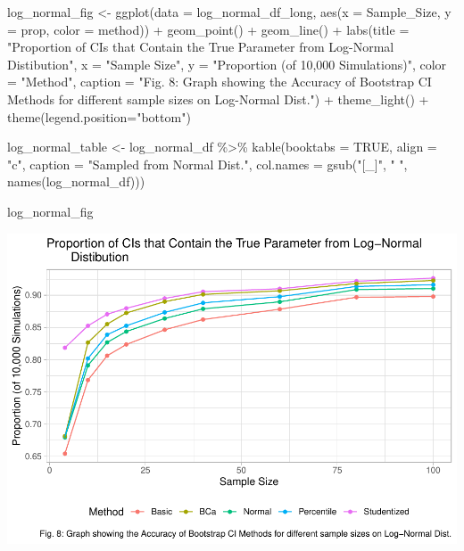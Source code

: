 \documentclass[12pt]{article}
\newenvironment{Shaded}{\begin{snugshade}}{\end{snugshade}}
\newcommand{\AttributeTok}[1]{\textcolor[rgb]{0.77,0.63,0.00}{#1}}
\newcommand{\ConstantTok}[1]{\textcolor[rgb]{0.00,0.00,0.00}{#1}}
\newcommand{\FunctionTok}[1]{\textcolor[rgb]{0.00,0.00,0.00}{#1}}
\newcommand{\NormalTok}[1]{#1}
\newcommand{\OtherTok}[1]{\textcolor[rgb]{0.56,0.35,0.01}{#1}}
\newcommand{\SpecialCharTok}[1]{\textcolor[rgb]{0.00,0.00,0.00}{#1}}
\newcommand{\StringTok}[1]{\textcolor[rgb]{0.31,0.60,0.02}{#1}}
\begin{document}
\begin{Shaded}
\begin{Highlighting}[]
\NormalTok{log\_normal\_fig }\OtherTok{\textless{}{-}} \FunctionTok{ggplot}\NormalTok{(}\AttributeTok{data =}\NormalTok{ log\_normal\_df\_long, }
                    \FunctionTok{aes}\NormalTok{(}\AttributeTok{x =}\NormalTok{ Sample\_Size, }\AttributeTok{y =}\NormalTok{ prop, }\AttributeTok{color =}\NormalTok{ method)) }\SpecialCharTok{+} 
  \FunctionTok{geom\_point}\NormalTok{() }\SpecialCharTok{+} \FunctionTok{geom\_line}\NormalTok{() }\SpecialCharTok{+} 
  \FunctionTok{labs}\NormalTok{(}\AttributeTok{title =} \StringTok{"Proportion of CIs that Contain the True Parameter from Log{-}Normal }
\StringTok{       Distibution"}\NormalTok{, }\AttributeTok{x =} \StringTok{"Sample Size"}\NormalTok{, }
       \AttributeTok{y =} \StringTok{"Proportion (of 10,000 Simulations)"}\NormalTok{, }\AttributeTok{color =} \StringTok{"Method"}\NormalTok{,}
       \AttributeTok{caption =} \StringTok{"Fig. 8: Graph showing the Accuracy of Bootstrap CI Methods for different sample sizes on Log{-}Normal Dist."}\NormalTok{) }\SpecialCharTok{+}
  \FunctionTok{theme\_light}\NormalTok{() }\SpecialCharTok{+}
  \FunctionTok{theme}\NormalTok{(}\AttributeTok{legend.position=}\StringTok{"bottom"}\NormalTok{)}
      
\NormalTok{log\_normal\_table }\OtherTok{\textless{}{-}}\NormalTok{ log\_normal\_df }\SpecialCharTok{\%\textgreater{}\%}
  \FunctionTok{kable}\NormalTok{(}\AttributeTok{booktabs =} \ConstantTok{TRUE}\NormalTok{, }\AttributeTok{align =} \StringTok{"c"}\NormalTok{, }\AttributeTok{caption =} \StringTok{"Sampled from Normal Dist."}\NormalTok{, }
        \AttributeTok{col.names =} \FunctionTok{gsub}\NormalTok{(}\StringTok{"[\_]"}\NormalTok{, }\StringTok{" "}\NormalTok{, }\FunctionTok{names}\NormalTok{(log\_normal\_df)))}
\end{Highlighting}
\end{Shaded}

\begin{Shaded}
\begin{Highlighting}[]
\NormalTok{log\_normal\_fig}
\end{Highlighting}
\end{Shaded}

\includegraphics{paper_files/figure-latex/unnamed-chunk-24-1.pdf}
\end{document}
